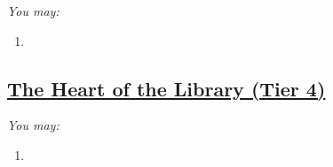\documentclass[sheet]{GL2020}
\begin{document}
\begingroup
\itshape
You may:
\begin{enumerate}[A]
  \item 
\end{enumerate}
\endgroup

\clearpage

\begin{center}\section*{\underline{The Heart of the Library (Tier 4)}}\end{center}
\label{HeartoftheLibrary}

\begingroup
\itshape
You may:
\begin{enumerate}[A]
  \item 
\end{enumerate}
\endgroup

\clearpage
\end{document}

